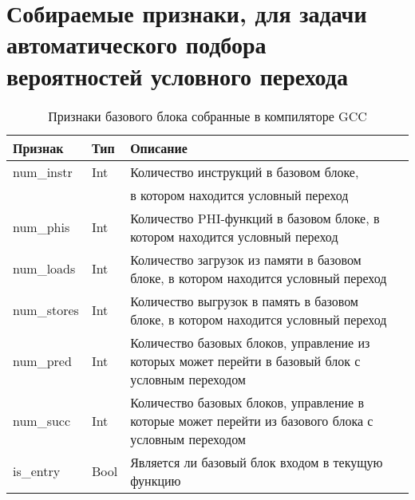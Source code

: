 \chapter{Собираемые признаки, для задачи автоматического подбора вероятностей условного перехода} \label{app:A}
\begin{table} [htbp]
	\raggedright
	\begin{threeparttable}%
		\caption{Признаки базового блока собранные в компиляторе GCC}\label{op:pgo_geatures1}%
		\begin{tabular}{| m{3cm} | m{1cm} |  m{9cm}l |}
			\hline
			\hline
			\centering \textbf{Признак}			 & \centering  \textbf{Тип} &  \centering  \textbf{Описание} & \\
			\hline
			\centering num\_instr			 & \centering  Int & Количество инструкций в базовом блоке, & \\
			&                 & в котором находится условный переход & \\
			\hline
			\centering num\_phis			 & \centering  Int &    Количество PHI-функций в базовом блоке, в котором находится условный переход & \\
			\hline
			\centering num\_loads			 & \centering  Int &    Количество загрузок из памяти в базовом блоке, в котором находится условный переход & \\
			\hline
			\centering num\_stores			 & \centering  Int &    Количество выгрузок в память в базовом блоке, в котором находится условный переход & \\
			\hline
			\centering num\_pred			 & \centering  Int &    Количество базовых блоков, управление из которых может перейти в базовый блок с условным переходом & \\
			\hline
			\centering num\_succ			 & \centering  Int &    Количество базовых блоков, управление в которые может перейти из базового блока с условным переходом & \\
			\hline
			\centering is\_entry			 & \centering  Bool &   Является ли базовый блок входом в текущую  функцию & \\
			\hline
			\hline
		\end{tabular}
	\end{threeparttable}
\end{table}

